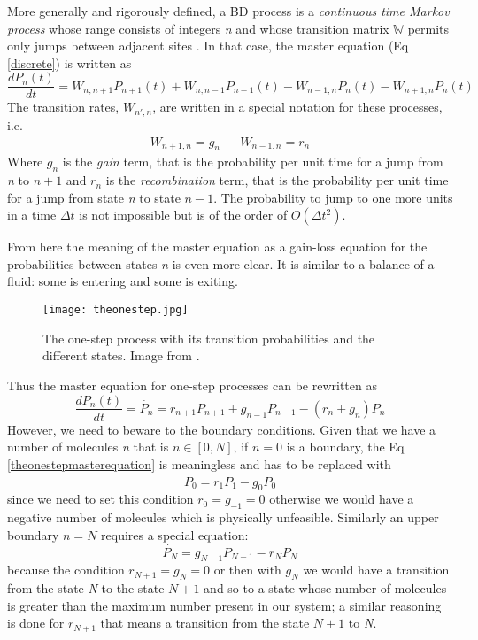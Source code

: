 \documentclass[12pt,a4paper]{report}
\begin{document}
More generally and rigorously defined, a BD process is a \emph{continuous time Markov process} whose range consists of integers \emph{n} and whose transition matrix $\mathbb{W}$ permits only jumps between adjacent sites \cite{Math}. In that case, the master equation (Eq \ref{discrete}) is written as
\begin{equation}\label{discreteonestep}
    \frac{dP_{n}(t)}{dt} = W_{n,n+1}P_{n+1}(t)+W_{n,n-1}P_{n-1}(t)-W_{n-1,n}P_{n}(t)-W_{n+1,n}P_{n}(t)
\end{equation}
The transition rates, $W_{n',n}$, are written in a special notation for these processes, i.e.
\begin{align}
W_{n+1,n} = g_{n} && W_{n-1,n} = r_{n} 
\end{align}
Where $g_{n}$ is the \emph{gain} term, that is the probability per unit time for a jump from \emph{n} to $n + 1$ and $r_{n}$ is the \emph{recombination} term, that is the probability per unit time for a jump from state \emph{n} to state $n - 1$. The probability to jump to one more units in a time $\Delta t$ is not impossible but is of the order of $O(\Delta t^{2})$. 


From here the meaning of the master equation as a gain-loss equation for the probabilities between states \emph{n} is even more clear. It is similar to a balance of a fluid: some is entering and some is exiting.
\begin{figure}[ht]
\texttt{[image: theonestep.jpg]}
\caption{ The one-step process with its transition probabilities and the different states. Image from \cite{Ragazza}.}
\label{theonestep}
\end{figure}
\newline 
Thus the master equation for one-step processes can be rewritten as
\begin{equation}\label{theonestepmasterequation}
\frac{dP_{n}(t)}{dt} = \dot{P_{n}} = r_{n+1}P_{n+1} + g_{n-1}P_{n-1}-(r_{n}+g_{n})P_{n}
\end{equation}
However, we need to beware to the boundary conditions. Given that we have a number of molecules \emph{n} that is $n \in [0,N]$, if $n = 0$ is a boundary, the Eq \ref{theonestepmasterequation} is meaningless and has to be replaced with 
\begin{equation}
\dot{P_{0}} = r_{1}P_{1} - g_{0}P_{0}
\end{equation}
since we need to set this condition $r_{0} = g_{-1} = 0$ otherwise we would have a negative number of molecules which is physically unfeasible. Similarly an upper boundary $n = N$ requires a special equation:
\begin{equation}
\dot{P_{N}} = g_{N-1}P_{N-1} - r_{N}P_{N}
\end{equation}
because the condition $r_{N+1}=g_{N}=0$ or then with $g_{N}$ we would have a transition from the state \emph{N} to the state $N+1$ and so to a state whose number of molecules is greater than the maximum number present in our system; a similar reasoning is done for $r_{N+1}$ that means a transition from the state $N+1$ to \emph{N}.
\end{document}
